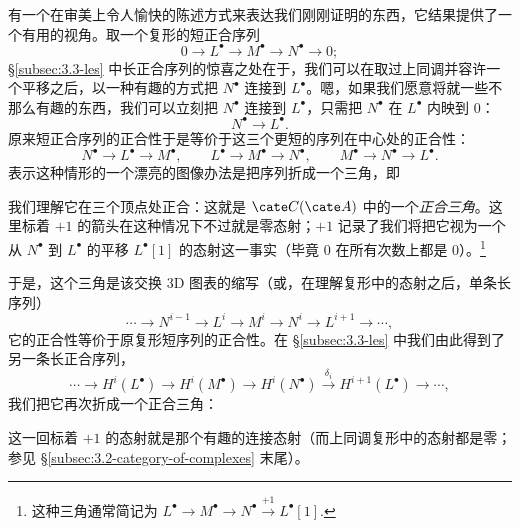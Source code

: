 有一个在审美上令人愉快的陈述方式来表达我们刚刚证明的东西，它结果提供了一个有用的视角。取一个复形的短正合序列
\[
0\longrightarrow L^\bullet\longrightarrow M^\bullet\longrightarrow N^\bullet\longrightarrow 0;
\]
\S\ref{subsec:3.3-les} 中长正合序列的惊喜之处在于，我们可以在取过上同调并容许一个平移之后，以一种有趣的方式把 $N^\bullet$ 连接到 $L^\bullet$。嗯，如果我们愿意将就一些不那么有趣的东西，我们可以立刻把 $N^\bullet$ 连接到 $L^\bullet$，只需把 $N^\bullet$ 在 $L^\bullet$ 内映到 $0$：
\[
N^\bullet\longrightarrow L^\bullet.
\]
原来短正合序列的正合性于是等价于这三个更短的序列在中心处的正合性：
\[
N^\bullet\longrightarrow L^\bullet\longrightarrow M^\bullet,\qquad
L^\bullet\longrightarrow M^\bullet\longrightarrow N^\bullet,\qquad
M^\bullet\longrightarrow N^\bullet\longrightarrow L^\bullet.
\]
表示这种情形的一个漂亮的图像办法是把序列折成一个三角，即
\begin{center}
\end{center}
我们理解它在三个顶点处正合：这就是 $\cate C(\cate A)$ 中的一个\emph{正合三角}。这里标着 $+1$ 的箭头在这种情况下不过就是零态射；$+1$ 记录了我们将把它视为一个从 $N^\bullet$ 到 $L^\bullet$ 的平移 $L^\bullet[1]$ 的态射这一事实（毕竟 $0$ 在所有次数上都是 $0$）。\footnote{这种三角通常简记为 $L^\bullet\to M^\bullet\to N^\bullet\xrightarrow{+1}L^\bullet[1]$.}
\begin{center}
\end{center}
于是，这个三角是该交换 3D 图表的缩写（或，在理解复形中的态射之后，单条长序列）
\[
\cdots\longrightarrow N^{i-1}\longrightarrow L^i\longrightarrow M^i\longrightarrow N^i\longrightarrow L^{i+1}\longrightarrow\cdots,
\]
它的正合性等价于原复形短序列的正合性。在 \S\ref{subsec:3.3-les} 中我们由此得到了另一条长正合序列，
\[
\cdots\longrightarrow H^i(L^\bullet)\longrightarrow H^i(M^\bullet)\longrightarrow H^i(N^\bullet)\xrightarrow{\delta_i} H^{i+1}(L^\bullet)\longrightarrow\cdots,
\]
我们把它再次折成一个正合三角：
\begin{center}
\end{center}
这一回标着 $+1$ 的态射就是那个有趣的连接态射（而上同调复形中的态射都是零；参见 \S\ref{subsec:3.2-category-of-complexes} 末尾）。

